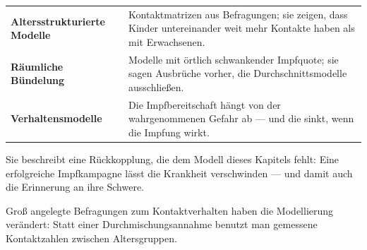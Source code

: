 \begin{forschung}
\begin{center}
{\small
\renewcommand{\arraystretch}{1.45}
\begin{tabular}{@{}P{2.8cm}P{5.4cm}@{}}
\toprule
\textbf{Alters\-strukturierte Modelle} & Kontaktmatrizen aus Befragungen; sie zeigen, dass Kinder untereinander weit mehr Kontakte haben als mit Erwachsenen.\\
\textbf{Räumliche Bündelung} & Modelle mit örtlich schwankender Impfquote; sie sagen Ausbrüche vorher, die Durchschnittsmodelle ausschließen.\\
\textbf{Verhaltens\-modelle} & Die Impfbereitschaft hängt von der wahrgenommenen Gefahr ab --- und die sinkt, wenn die Impfung wirkt.\\
\bottomrule
\end{tabular}}
\end{center}

Sie beschreibt eine Rückkopplung, die dem Modell dieses Kapitels fehlt: Eine erfolgreiche Impfkampagne lässt die Krankheit verschwinden --- und damit auch die Erinnerung an ihre Schwere.

\begin{center}
\begin{minipage}{0.88\textwidth}
\end{minipage}
\end{center}

Groß angelegte Befragungen zum Kontaktverhalten haben die Modellierung verändert: Statt einer Durchmischungsannahme benutzt man gemessene Kontaktzahlen zwischen Altersgruppen.

\begin{center}
\begin{minipage}{0.88\textwidth}
\end{minipage}
\end{center}
\end{forschung}

